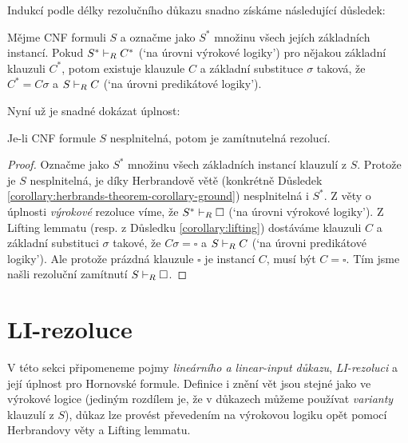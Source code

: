 Indukcí podle délky rezolučního důkazu snadno získáme následující důsledek:

\begin{corollary}\label{corollary:lifting}
Mějme CNF formuli $S$ a označme jako $S^*$ množinu všech jejích základních instancí. Pokud $S^*\vdash_R C^*$ (`na úrovni výrokové logiky') pro nějakou základní klauzuli $C^*$, potom existuje klauzule $C$ a základní substituce $\sigma$ taková, že $C^*=C\sigma$ a $S\vdash_R C$ (`na úrovni predikátové logiky').
\end{corollary}

Nyní už je snadné dokázat úplnost:

\begin{theorem}\label{theorem:completeness-of-predicate-resolution}
    Je-li CNF formule $S$ nesplnitelná, potom je zamítnutelná rezolucí.
\end{theorem}
\begin{proof}
Označme jako $S^*$ množinu všech základních instancí klauzulí z $S$. Protože je $S$ nesplnitelná, je díky Herbrandově větě (konkrétně Důsledek \ref{corollary:herbrands-theorem-corollary-ground}) nesplnitelná i $S^*$. Z věty o úplnosti \emph{výrokové} rezoluce víme, že $S^*\vdash_R\square$ (`na úrovni výrokové logiky'). Z Lifting lemmatu (resp. z Důsledku \ref{corollary:lifting}) dostáváme klauzuli $C$ a základní substituci $\sigma$ takové, že $C\sigma=\square$ a $S\vdash_R C$ (`na úrovni predikátové logiky'). Ale protože prázdná klauzule $\square$ je instancí $C$, musí být $C=\square$. Tím jsme našli rezoluční zamítnutí $S\vdash_R \square$.
\end{proof}


\section{LI-rezoluce}\label{section:predicate-LI-resolution}

V této sekci připomeneme pojmy \emph{lineárního a linear-input důkazu}, \emph{LI-rezoluci} a její úplnost pro Hornovské formule. Definice i znění vět jsou stejné jako ve výrokové logice (jediným rozdílem je, že v důkazech můžeme používat \emph{varianty} klauzulí z $S$), důkaz lze provést převedením na výrokovou logiku opět pomocí Herbrandovy věty a Lifting lemmatu.

